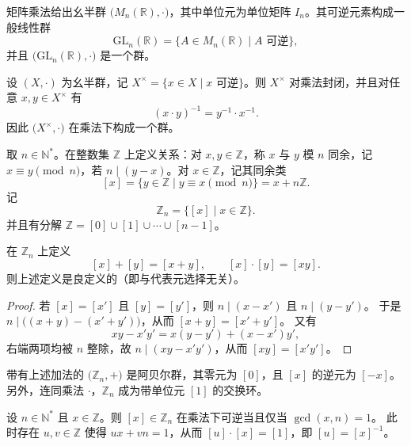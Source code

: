 \documentclass[lang=cn,a4paper,newtx]{elegantbook}
\begin{document}
\begin{example}
矩阵乘法给出幺半群 $\bigl(M_n(\mathbb R),\cdot\bigr)$，其中单位元为单位矩阵 $I_n$。其可逆元素构成一般线性群
\[
  \mathrm{GL}_n(\mathbb R)=\{A\in M_n(\mathbb R)\mid A\text{ 可逆}\},
\]
并且 $\bigl(\mathrm{GL}_n(\mathbb R),\cdot\bigr)$ 是一个群。
\end{example}

\begin{proposition}
设 $(X,\cdot)$ 为幺半群，记 $X^{\times}=\{x\in X\mid x\text{ 可逆}\}$。则 $X^{\times}$ 对乘法封闭，并且对任意 $x,y\in X^{\times}$ 有
\[
  (x\cdot y)^{-1}=y^{-1}\cdot x^{-1}.
\]
因此 $\bigl(X^{\times},\cdot\bigr)$ 在乘法下构成一个群。
\end{proposition}

\medskip
\begin{definition}[$\mathbb Z_n$]
取 $n\in\mathbb N^{*}$。在整数集 $\mathbb Z$ 上定义关系：对 $x,y\in\mathbb Z$，称 $x$ 与 $y$ 模 $n$ 同余，记 $x\equiv y\pmod n$，若 $n\mid (y-x)$。对 $x\in\mathbb Z$，记其同余类
\[
  [x]=\{y\in\mathbb Z\mid y\equiv x\pmod n\}=x+n\mathbb Z.
\]
记
\[
  \mathbb Z_n=\{[x]\mid x\in\mathbb Z\}.
\]
并且有分解 $\mathbb Z=[0]\cup[1]\cup\cdots\cup[n-1]$。
\end{definition}

\begin{proposition}
在 $\mathbb Z_n$ 上定义
\[
  [x]+[y]=[x+y],\qquad [x]\cdot[y]=[xy].
\]
则上述定义是良定义的（即与代表元选择无关）。
\end{proposition}

\begin{proof}
若 $[x]=[x']$ 且 $[y]=[y']$，则 $n\mid (x-x')$ 且 $n\mid (y-y')$。
于是 $n\mid\bigl((x+y)-(x'+y')\bigr)$，从而 $[x+y]=[x'+y']$。
又有
\[
  xy-x'y'=x(y-y')+(x-x')y',
\]
右端两项均被 $n$ 整除，故 $n\mid (xy-x'y')$，从而 $[xy]=[x'y']$。
\end{proof}

\begin{example}
带有上述加法的 $\bigl(\mathbb Z_n,+\bigr)$ 是阿贝尔群，其零元为 $[0]$，且 $[x]$ 的逆元为 $[-x]$。
另外，连同乘法 $\cdot$，$\mathbb Z_n$ 成为带单位元 $[1]$ 的交换环。
\end{example}

\begin{proposition}
设 $n\in\mathbb N^{*}$ 且 $x\in\mathbb Z$。则 $[x]\in\mathbb Z_n$ 在乘法下可逆当且仅当 $\gcd(x,n)=1$。
此时存在 $u,v\in\mathbb Z$ 使得 $ux+vn=1$，从而 $[u]\cdot[x]=[1]$，即 $[u]=[x]^{-1}$。
\end{proposition}
\end{document}
